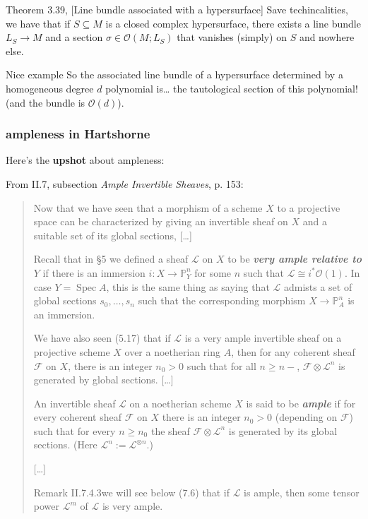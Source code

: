 \begin{thing4}{Theorem 3.39, \cite{lec}}[Line bundle associated with a hypersurface]\label{thm:3.39, lec}\leavevmode
Save techincalities, we have that if \(S \subseteq M\) is a closed complex hypersurface, there exists a line bundle \(L_S \to M\) and a section \(\sigma \in \mathcal{O}(M;L_S)\) that vanishes (simply) on \(S\) and nowhere else.
\end{thing4}

\begin{thing8}{Nice example}\leavevmode
So the associated line bundle of a hypersurface determined by a homogeneous degree \(d\) polynomial is… the tautological section of this polynomial! (and the bundle is \(\mathcal{O}(d)\)).
\end{thing8}




\subsubsection*{ampleness in Hartshorne}

Here's the \textbf{upshot} about ampleness:

From II.7, subsection \textit{Ample Invertible Sheaves}, p. 153:
\begin{quotation}
	Now that we have seen that a morphism of a scheme \(X\) to a projective space can be characterized by giving an invertible sheaf on \(X\) and a suitable set of its global sections, […]

	Recall that in §5 we defined a sheaf \(\mathcal{L}\) on \(X\) to be \textit{\textbf{very ample relative to \(Y\)}} if there is an immersion \(i: X \to \mathbb{P}^n_Y\) for some \(n\) such that \(\mathcal{L} \cong i^*\mathcal{O}(1)\). In case \(Y = \operatorname{Spec}A\), this is the same thing as saying that \(\mathcal{L}\) admists a set of global sections \(s_0,\ldots,s_n\) such that the corresponding morphism \(X \to \mathbb{P}^n_A\) is an immersion.

	We have also seen (5.17) that if \(\mathcal{L}\) is a very ample invertible sheaf on a projective scheme \(X\) over a noetherian ring \(A\), then for any coherent sheaf \(\mathcal{F}\) on \(X\), there is an integer \(n_0>0\) such that for all \(n \geq  n-\), \(\mathcal{F} \otimes \mathcal{L}^n\) is generated by global sections. […]
	\begin{defn}\leavevmode
	An invertible sheaf \(\mathcal{L}\) on a noetherian scheme \(X\) is said to be \textit{\textbf{ample}} if for every coherent sheaf  \(\mathcal{F}\) on \(X\) there is an integer \(n_0>0\) (depending on \(\mathcal{F}\)) such that for every \(n \geq  n_0\) the sheaf \(\mathcal{F} \otimes \mathcal{L}^n\) is generated by its global sections. (Here \(\mathcal{L}^n:= \mathcal{L}^{\otimes n}\).)
	\end{defn}
	[…]
	\begin{thing5}{Remark II.7.4.3}\label{rk:II.7.4.3}\leavevmode
		[…] we will see below (7.6) that if \(\mathcal{L}\) is ample, then some tensor power  \(\mathcal{L}^m\) of \(\mathcal{L}\) is very ample.
	\end{thing5}
\end{quotation}


